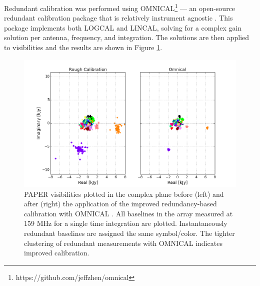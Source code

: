 \documentclass[twocolumn,numberedappendix]{emulateapj} \shorttitle{PSA64}
\begin{document}
%    
%       

Redundant calibration was performed using 
OMNICAL\footnote{https://github.com/jeffzhen/omnical} --- an open-source
redundant calibration package that is relatively instrument agnostic
\citep{zheng_et_al2014}. This package implements both LOGCAL
and LINCAL, solving for a complex gain solution per antenna, frequency, and
integration. The solutions are then applied to visibilities and the results are
shown in Figure \ref{fig:omniview}.

\begin{figure}
\centering
\includegraphics[width=1.5\columnwidth]{plots/omniview_64.png}
\caption{
PAPER visibilities plotted in the complex plane before (left) and
after (right) the 
application of the improved redundancy-based calibration with OMNICAL
\citep{zheng_et_al2014}.  All baselines in the array measured at 159 MHz for a
single time integration are plotted.  Instantaneously redundant baselines are
assigned the same symbol/color.  The tighter clustering of redundant
measurements with OMNICAL indicates improved calibration.
} 
\label{fig:omniview}
\end{figure}
\end{document}
